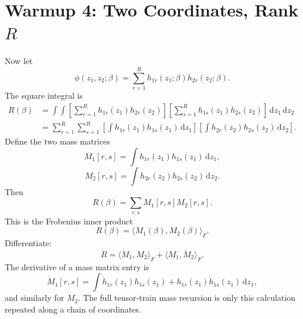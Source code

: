 \documentclass[11pt]{article}
\numberwithin{equation}{section}
\newcommand{\dd}{\,\mathrm d}
\begin{document}
\section{Warmup 4: Two Coordinates, Rank \texorpdfstring{\(R\)}{R}}

Now let
\begin{equation}
    \phi(z_1,z_2;\beta)
    =
    \sum_{r=1}^{R}h_{1r}(z_1;\beta)h_{2r}(z_2;\beta).
    \label{eq:p24-p19-29}
\end{equation}
The square integral is
\begin{equation}
\begin{aligned}
    R(\beta)
    &=
    \int\!\!\int
    \left[
    \sum_{r=1}^{R}h_{1r}(z_1)h_{2r}(z_2)
    \right]
    \left[
    \sum_{s=1}^{R}h_{1s}(z_1)h_{2s}(z_2)
    \right]
    \dd z_1\dd z_2\\
    &=
    \sum_{r=1}^{R}\sum_{s=1}^{R}
    \left[\int h_{1r}(z_1)h_{1s}(z_1)\dd z_1\right]
    \left[\int h_{2r}(z_2)h_{2s}(z_2)\dd z_2\right].
\end{aligned}
\label{eq:p24-p19-30}
\end{equation}
Define the two mass matrices
\begin{equation}
    M_1[r,s]=\int h_{1r}(z_1)h_{1s}(z_1)\dd z_1,
    \label{eq:p24-p19-31}
\end{equation}
\begin{equation}
    M_2[r,s]=\int h_{2r}(z_2)h_{2s}(z_2)\dd z_2.
    \label{eq:p24-p19-32}
\end{equation}
Then
\begin{equation}
    R(\beta)=\sum_{r,s}M_1[r,s]M_2[r,s].
    \label{eq:p24-p19-33}
\end{equation}
This is the Frobenius inner product
\begin{equation}
    R(\beta)=\langle M_1(\beta),M_2(\beta)\rangle_F.
    \label{eq:p24-p19-34}
\end{equation}
Differentiate:
\begin{equation}
    \dot R
    =
    \langle \dot M_1,M_2\rangle_F
    +
    \langle M_1,\dot M_2\rangle_F.
    \label{eq:p24-p19-35}
\end{equation}
The derivative of a mass matrix entry is
\begin{equation}
    \dot M_1[r,s]
    =
    \int
    \dot h_{1r}(z_1)h_{1s}(z_1)
    +
    h_{1r}(z_1)\dot h_{1s}(z_1)
    \dd z_1,
    \label{eq:p24-p19-36}
\end{equation}
and similarly for \(M_2\).  The full tensor-train mass recursion is only this
calculation repeated along a chain of coordinates.
\end{document}

